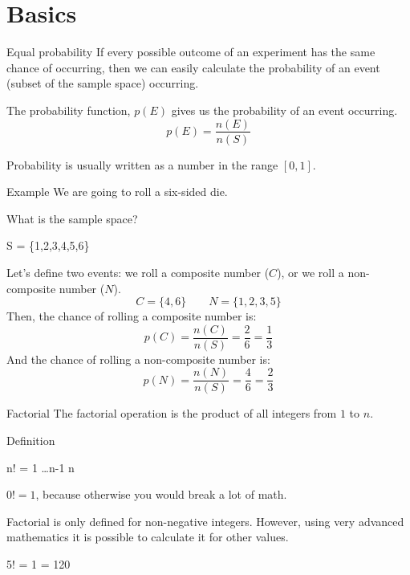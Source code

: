 	\section{Basics}
	\begin{namedframe}{Equal probability}
		If every possible outcome of an experiment has the same chance of occurring, then we can easily calculate the probability of an event (subset of the sample space) occurring.

		The probability function, $p(E)$ gives us the probability of an event occurring.
		\[p(E) = \frac{n(E)}{n(S)}\]

		Probability is usually written as a number in the range $[0,1]$.
	\end{namedframe}
	\begin{namedframe}{Example}
		We are going to roll a six-sided die.
		\begin{exampleblock}{What is the sample space?}
			\pause
			\begin{compactmath}
				S = \{1,2,3,4,5,6\}
			\end{compactmath}
		\end{exampleblock}
		\pause
		Let's define two events: we roll a composite number ($C$), or we roll a non-composite number ($N$).
		\[C = \{4,6\} \qquad N = \{1,2,3,5\}\]
		\pause
		Then, the chance of rolling a composite number is:
		\[p(C) = \frac{n(C)}{n(S)} = \frac{2}{6} = \frac{1}{3}\]
		\pause
		And the chance of rolling a non-composite number is:
		\pause
		\[p(N) = \frac{n(N)}{n(S)} = \frac{4}{6} = \frac{2}{3}\]
	\end{namedframe}
	\begin{namedframe}{Factorial}
		The factorial operation is the product of all integers from $1$ to $n$.
		\pause
		\begin{block}{Definition}
			\begin{compactmath}[\Large]
				n! = 1  \times \dots \times n-1 \times n
			\end{compactmath}

			$0! = 1$, because otherwise you would break a lot of math.

			\scriptsize
			Factorial is only defined for non-negative integers. However, using very advanced mathematics it is possible to calculate it for other values.
		\end{block}
		\pause
		\begin{example}
			\begin{compactmath}[\large]
				5! = 1    \times 5 = 120
			\end{compactmath}
		\end{example}
	\end{namedframe}
